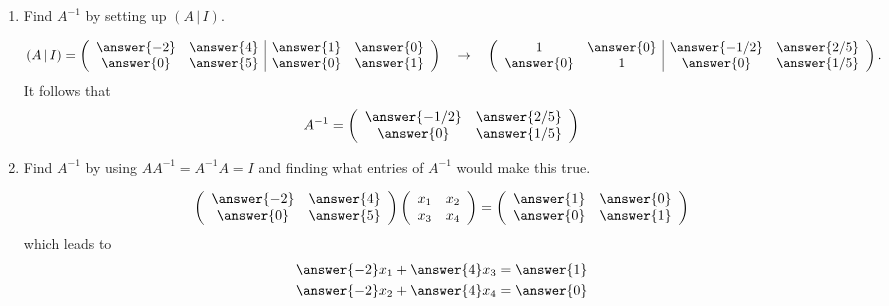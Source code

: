 \documentclass{ximera}
\begin{document}
\begin{exercise}
\begin{enumerate}
  \item Find $A^{-1}$ by setting up $(A \,|\, I)$.
    \begin{prompt}
      \[
        (A \,|\, I ) = \left(
          \begin{array}{cc|cc}
            \answer{-2} & \answer{4} & \answer{1} & \answer{0}\\
            \answer{0} & \answer{5} & \answer{0} & \answer{1}\\
          \end{array}
        \right)
        \quad \to \quad
        \left(
          \begin{array}{cc|cc}
            1 & \answer{0} & \answer{-1/2} & \answer{2/5}\\
            \answer{0} & 1 & \answer{0} & \answer{1/5}
          \end{array}
        \right).
      \]
      It follows that
      \[
        A^{-1} = \left(
          \begin{array}{cc}
            \answer{-1/2} & \answer{2/5}\\
            \answer{0} & \answer{1/5}
          \end{array}
        \right)
      \]
    \end{prompt}
  \item Find $A^{-1}$ by using $AA^{-1}= A^{-1}A=I$ and finding what
    entries of $A^{-1}$ would make this true.
    \begin{prompt}
      \[
        \left(
          \begin{array}{cc}
            \answer{-2} & \answer{4}\\
            \answer{0} & \answer{5}
          \end{array}
        \right)
        \left(
          \begin{array}{cc}
            x_{1} & x_{2}\\
            x_{3} & x_{4}
          \end{array}
        \right) = \left(
          \begin{array}{cc}
            \answer{1} & \answer{0}\\
            \answer{0} & \answer{1}
          \end{array}
        \right)
      \]
      which leads to
      \begin{align*}
        \answer{-2}x_{1} + \answer{4}x_{3} &= \answer{1}\\
        \answer{-2}x_{2} + \answer{4}x_{4} &= \answer{0}\\

\end{align*}
\end{prompt}
\end{enumerate}
\end{exercise}
\end{document}
